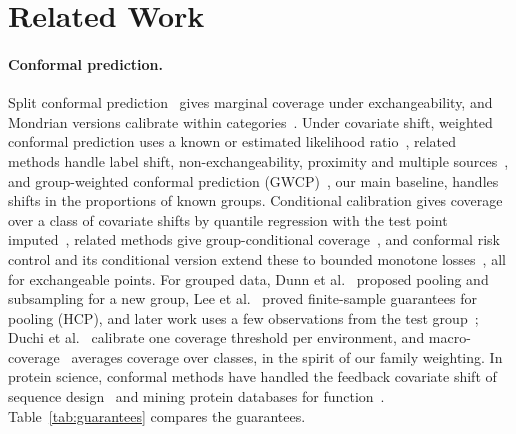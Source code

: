 \section{Related Work}\label{sec:related}

\paragraph{Conformal prediction.}
Split conformal prediction~\cite{vovk2005algorithmic,lei2018distribution} gives marginal coverage under exchangeability, and Mondrian versions calibrate within categories~\cite{vovk2012conditional,ding2023class}. Under covariate shift, weighted conformal prediction uses a known or estimated likelihood ratio~\cite{tibshirani2019conformal,lei2021conformal}, related methods handle label shift, non-exchangeability, proximity and multiple sources~\cite{podkopaev2021distribution,barber2023beyond,guan2023localized,cauchois2024robust,liu2024multisource}, and group-weighted conformal prediction (GWCP)~\cite{bhattacharyya2024group}, our main baseline, handles shifts in the proportions of known groups. Conditional calibration gives coverage over a class of covariate shifts by quantile regression with the test point imputed~\cite{gibbs2025conformal}, related methods give group-conditional coverage~\cite{jung2022batch,bairaktari2025kandinsky}, and conformal risk control and its conditional version extend these to bounded monotone losses~\cite{angelopoulos2024conformal,blot2025automatically}, all for exchangeable points. For grouped data, Dunn et al.~\cite{dunn2023distribution} proposed pooling and subsampling for a new group, Lee et al.~\cite{lee2026hierarchical} proved finite-sample guarantees for pooling (HCP), and later work uses a few observations from the test group~\cite{mallick2026generalized}; Duchi et al.~\cite{duchi2024predictive} calibrate one coverage threshold per environment, and macro-coverage~\cite{bhattacharyya2026macro} averages coverage over classes, in the spirit of our family weighting. In protein science, conformal methods have handled the feedback covariate shift of sequence design~\cite{fannjiang2022conformal} and mining protein databases for function~\cite{boger2025functional}. Table~\ref{tab:guarantees} compares the guarantees.

